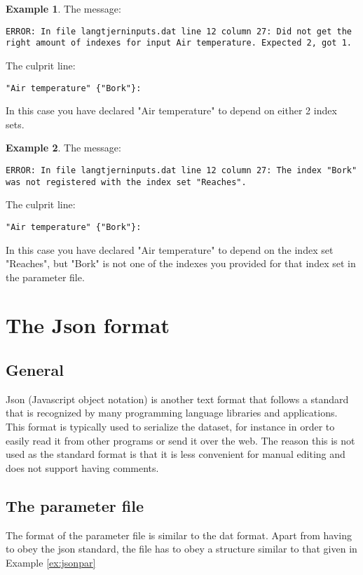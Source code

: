 \documentclass[11pt]{article}
\theoremstyle{definition}
\newtheorem{myexample}{Example}
\newenvironment{example}%
  {\begin{lrbox}{\examplebox}%
   \begin{minipage}{\dimexpr\linewidth-2\fboxsep}
   \begin{myexample}}%
  {\end{myexample}%
   \end{minipage}%
   \end{lrbox}%
   \begin{trivlist}
     \item[]\colorbox{silver}{\usebox\examplebox}
   \end{trivlist}}
\begin{document}
\begin{example}
The message:
\begin{lstlisting}
ERROR: In file langtjerninputs.dat line 12 column 27: Did not get the right amount of indexes for input Air temperature. Expected 2, got 1.
\end{lstlisting}
The culprit line:
\begin{lstlisting}[mathescape]
"Air temperature" {"Bork"}:
\end{lstlisting}
In this case you have declared "Air temperature" to depend on either 2 index sets.
\end{example}

\begin{example}
The message:
\begin{lstlisting}
ERROR: In file langtjerninputs.dat line 12 column 27: The index "Bork" was not registered with the index set "Reaches".
\end{lstlisting}
The culprit line:
\begin{lstlisting}[mathescape]
"Air temperature" {"Bork"}:
\end{lstlisting}
In this case you have declared "Air temperature" to depend on the index set "Reaches", but "Bork" is not one of the indexes you provided for that index set in the parameter file.
\end{example}

\section{The Json format}

\subsection{General}

Json (Javascript object notation)  is another text format that follows a standard that is recognized by many programming language libraries and applications. This format is typically used to serialize the dataset, for instance in order to easily read it from other programs or send it over the web. The reason this is not used as the standard format is that it is less convenient for manual editing and does not support having comments.

\subsection{The parameter file}
The format of the parameter file is similar to the dat format. Apart from having to obey the json standard, the file has to obey a structure similar to that given in Example \ref{ex:jsonpar}
\end{document}
